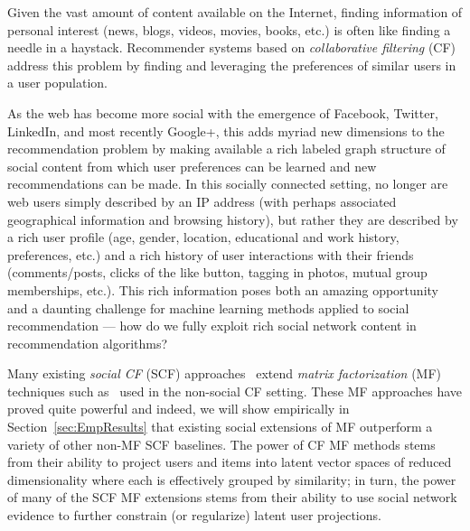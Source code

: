 Given the vast amount of content available on the Internet, finding
information of personal interest (news, blogs, videos, movies, books,
etc.) is often like finding a needle in a haystack.  Recommender
systems based on \emph{collaborative filtering}
(CF)~\cite{collab_filtering} address this problem by finding
and leveraging the preferences of similar users in a user population.



As the web has become more social with the emergence of Facebook,
Twitter, LinkedIn, and most recently Google+, this adds myriad new
dimensions to the recommendation problem by making available a rich
labeled graph structure of social content from which user preferences
can be learned and new recommendations can be made.  In this socially
connected setting, no longer are web users simply described by an IP
address (with perhaps associated geographical information and browsing
history), but rather they are described by a rich user profile (age,
gender, location, educational and work history, preferences, etc.)
and a rich history of user interactions with their friends (comments/posts, 
clicks of the like button, tagging in photos, mutual group
memberships, etc.).  This rich information poses both an amazing
opportunity and a daunting challenge for machine learning methods
applied to social recommendation --- how do we fully exploit rich social
network content in recommendation algorithms?

Many existing \emph{social CF} (SCF)
approaches~\cite{ste,sorec,lla,socinf,sr,rrmf} extend \emph{matrix
factorization} (MF) techniques such as~\cite{pmf} used in the
non-social CF setting.  These MF approaches have proved quite powerful
and indeed, we will show empirically in Section~\ref{sec:EmpResults} 
that existing social extensions of MF outperform a variety of other
non-MF SCF baselines.  The power of CF MF methods stems from their
ability to project users and items into latent vector spaces of
reduced dimensionality where each is effectively grouped by
similarity; in turn, the power of many of the SCF MF extensions stems
from their ability to use social network evidence to further constrain
(or regularize) latent user projections.

